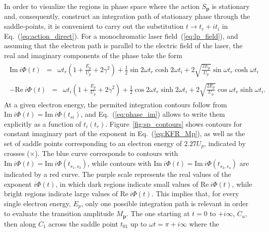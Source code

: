 In order to visualize the regions in phase space where the action
$S_{\mathbf{p}}$ is stationary and, consequently, construct an
integration path of stationary phase through the saddle-points, it is
convenient to carry out the substitution $t \to t_{r} + it_{i}$ in
Eq.~(\ref{eq:action_direct}). For a monochromatic laser
field~(\ref{eq:lp_field}), and assuming that the electron path is
parallel to the electric field of the laser, the real and imaginary
components of the phase take the form~\cite{phd_Kopold}
%
\begin{eqnarray}
  \label{eq:phase_im}
  \begin{split}
    \mathrm{Im}\ i\Phi(t) & = & \omega t_{r} ( 1 + \frac{E_{p}}{U_{p}}
    + 2\gamma^{2} ) +
    \frac{1}{2} \sin 2\omega t_{r} \cosh 2\omega t_{i}
    + 2\sqrt{\frac{2E_{p}}{U_{p}}} \sin\omega t_{r} \cosh\omega t_{i}
  \end{split}
\end{eqnarray}
%
\begin{eqnarray}
  \label{eq:phase_re}
  \begin{split}
    -\mathrm{Re}\ i\Phi(t) & = & \omega t_{i} (
    1 + \frac{E_{p}}{U_{p}} + 2\gamma^{2} )
    + \frac{1}{2} \cos 2\omega t_{r} \sinh 2\omega t_{i}
    + 2\sqrt{\frac{2E_{p}}{U_{p}}} \cos\omega t_{r} \sinh\omega t_{i}.
  \end{split}
\end{eqnarray}
%
At a given electron energy, the permited integration contours follow
from $\mathrm{Im}\ i \Phi(t) = \mathrm{Im}\ i \Phi(t_{si})$, and
Eq.~(\ref{eq:phase_im}) allows to write them explicitly as a function
of $t_{i}(t_{r})$. Figure~\ref{fig:sp_contours} shows contours for
constant imaginary part of the exponent in Eq.~(\ref{eq:KFR_Mp}), as
well as the set of saddle points corresponding to an electron energy
of $2.27 U_{p}$, indicated by crosses ($\times$). The blue curve
corresponds to contours with $\mathrm{Im}\ i \Phi(t) = \mathrm{Im}\ i
\Phi(t_{s_{1},s_{3}})$, while contours with $\mathrm{Im}\ i \Phi(t) =
\mathrm{Im}\ i \Phi(t_{s_{2},s_{4}})$ are indicated by a red
curve. The purple scale represents the real values of the exponent
$i\Phi(t)$, in which dark regions indicate small values of
$\mathrm{Re}\ i\Phi(t)$, while bright regions indicate large values of
$\mathrm{Re}\ i\Phi(t)$. This implies that, for every single electron
energy, $E_{p}$, only one possible integration path is relevant in
order to evaluate the transition amplitude $M_{\mathbf{p}}$. The one
starting at $t = 0$ to $+i\infty$, $C_{a}$, then along $C_{1}$ across
the saddle point $t_{01}$ up to $\omega t = \pi + i\infty$ where the
